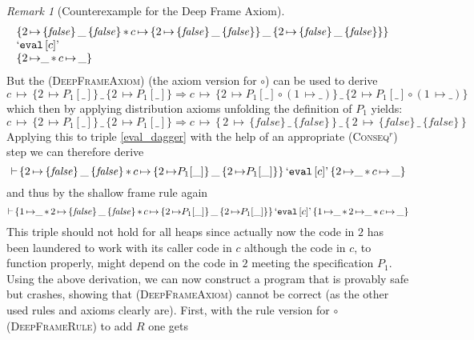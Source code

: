 \documentclass{LMCS}
\theoremstyle{remark}
\newtheorem{remark}[theorem]{Remark}
\newcommand{\QUOTE}[1]{\textnormal{`\ensuremath{#1}'}}
\newcommand{\UNQUOTE}[1]{\SYN{eval}\,{#1}}
\newcommand{\SYN}[1]{\ensuremath{\texttt{#1}}}
\newcommand{\triple}[3]{{\ensuremath{\!\left.\{ #1 \}\, #2\, \{  #3 \}\!\right.}}}
\newcommand{\False}{\ensuremath{\mathit{false}}}
\newcommand{\pointsto}{\ensuremath{\mapsto}}
\newcommand{\ntria}[4]{{{#1}\,{\mapsto}\,{{\{{#2}\}}{\, #3\, }{\{{#4}\}}}}\xspace}
\begin{document}
\begin{remark}[Counterexample for the Deep Frame Axiom]
\begin{equation}\label{eval_dagger}
\begin{array}{ll}
\{ \ntria{2}{\False}{\_}{\False}\, {*}\, \ntria{c}{\ntria{2}{\False}{\_}{\False}}{\_}{\ntria{2}{\False}{\_}{\False}} \}&\\
   {\QUOTE {\UNQUOTE{[c]} }}   \\
    \{ 2\,{\pointsto}\_\, {*}\,  c\,{\pointsto} \, \_ \} &
\end{array} \vspace{0.2cm}
\end{equation}
 But the  (\textsc{DeepFrameAxiom}) (the axiom version for $\circ$)  can be used to derive
$$ \ntria{c}{ {2\, {\pointsto} P_1[\_]}}{\_}{2\,{\pointsto} P_1[\_] }  \Longrightarrow 
 \ntria{c}{ {2\, {\pointsto} P_1[\_]} \circ  (1\, {\pointsto}\_ ) }{\_}{2\,{\pointsto} P_1[\_]   \circ (1\, {\pointsto}\_ )} 
 $$
 which then  by applying distribution axioms unfolding the definition of $P_1$ yields:
  $$ \ntria{c}{ {2\, {\pointsto} P_1[\_]}}{\_}{2\,{\pointsto} P_1[\_] }  \Longrightarrow 
 \ntria{c}{\, \ntria{2}{\False}{\_}{\False}\, }{\_}{\, \ntria{2}{\False}{\_}{\False}\,} 
 $$
 Applying this to triple \eqref{eval_dagger} with the help of an appropriate (\textsc{Conseq}$^r$) step we can therefore derive
$$
  {\adash}\,
  \triple
    { \ntria{2}{\False}{\_}{\False}\, {*}\, \ntria{c}{ {2\, {\pointsto} P_1[\_]}}{\_}{2\,{\pointsto} P_1[\_] }}
    {\QUOTE{\UNQUOTE{[c]}}}
    {  2\,{\pointsto}\_\, {*}\,  c\,{\pointsto} \, \_}
$$
and thus by the shallow frame rule again
$$
  {\adash}\,
  \triple
    {1\,{\pointsto} \_  \, {*} \, \ntria{2}{\False}{\_}{\False}\, {*}\, \ntria{c}{ {2\, {\pointsto} P_1[\_]}}{\_}{2\,{\pointsto} P_1[\_] }}
    { \QUOTE{\UNQUOTE{[c]} }}
    {1\,{\pointsto} \_  \, {*} \, 2\,{\pointsto}\_\, {*}\,  c\,{\pointsto} \, \_}
$$
This  triple   should not hold for all heaps since actually now the code in $2$ has been laundered to work with its caller code in $c$ although  the code in $c$, to function properly, might depend on the code in $2$ meeting the specification $P_1$.  Using the above derivation, we can now construct a program that is provably safe but crashes, showing that (\textsc{DeepFrameAxiom}) cannot be correct (as the other used rules and axioms clearly are). First, with the rule version for $\circ$ (\textsc{DeepFrameRule}) to add $R$ one   gets


\end{remark}
\end{document}
